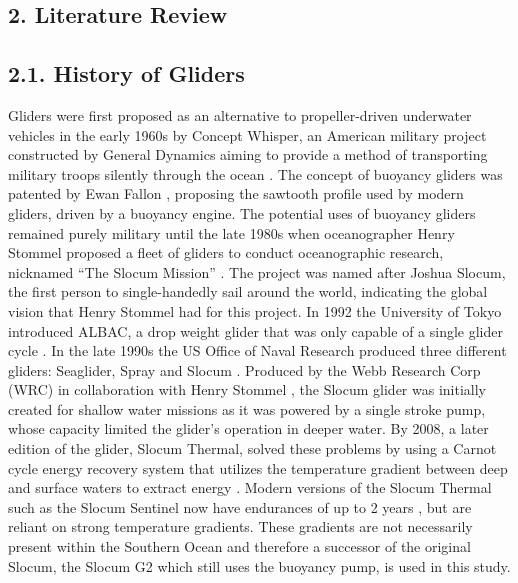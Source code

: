 \documentclass[
	a4paper, %
	10pt, %
	unnumberedsections, %
	twoside, %
]{LTJournalArticle}
\begin{document}
\begin{multicols}{2}
\section{2. Literature Review}
\subsection{2.1. History of Gliders}
Gliders were first proposed as an alternative to propeller-driven underwater vehicles in the early 1960s by Concept Whisper,
an American military project constructed by General Dynamics aiming to provide a method of transporting military troops silently
through the ocean \citep{ref12}. The concept of buoyancy gliders was patented by Ewan Fallon \citep{ref13}, proposing the
sawtooth profile used by modern gliders, driven by a buoyancy engine. The potential uses of buoyancy gliders remained purely
military until the late 1980s when oceanographer Henry Stommel proposed a fleet of gliders to conduct oceanographic research,
nicknamed “The Slocum Mission” \citep{ref14}. The project was named after Joshua Slocum, the first person to single-handedly sail
around the world, indicating the global vision that Henry Stommel had for this project. In 1992 the University of Tokyo introduced
ALBAC, a drop weight glider that was only capable of a single glider cycle \citep{ref16}. In the late 1990s the US Office of Naval
Research produced three different gliders: Seaglider, Spray and Slocum \citep{ref15}. Produced by the Webb Research Corp (WRC) in
collaboration with Henry Stommel \citep{ref18}, the Slocum glider was initially created for shallow water missions as it was
powered by a single stroke pump, whose capacity limited the glider's operation in deeper water. By 2008, a later edition of the
glider, Slocum Thermal, solved these problems by using a Carnot cycle energy recovery system that utilizes the temperature gradient
between deep and surface waters to extract energy \citep{ref12}. Modern versions of the Slocum Thermal such as the Slocum Sentinel
now have endurances of up to 2 years \citep{ref27}, but are reliant on strong temperature gradients. These gradients are not
necessarily present within the Southern Ocean and therefore a successor of the original Slocum, the Slocum G2 which still uses the buoyancy pump, is used in this study.


\end{multicols}
\end{document}
